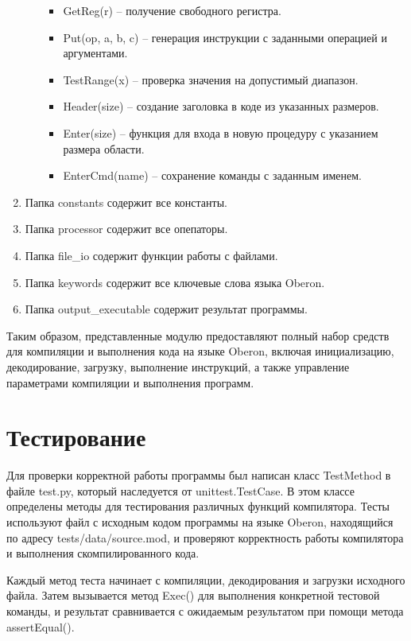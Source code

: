 \begin{enumerate}
\begin{itemize}[label = ---]
\begin{itemize}[label = +]
            \item GetReg(r) – получение свободного регистра.
            \item Put(op, a, b, c) – генерация инструкции с заданными операцией и аргументами.
            \item TestRange(x) – проверка значения на допустимый диапазон.
            \item Header(size) – создание заголовка в коде из указанных размеров.
            \item Enter(size) – функция для входа в новую процедуру с указанием размера области.
            \item EnterCmd(name) – сохранение команды с заданным именем.
        \end{itemize}
    \end{itemize} 
    \item Папка constants содержит все константы.
    \item Папка processor содержит все опепаторы.
    \item Папка file\_io содержит функции работы с файлами. 
    \item Папка keywords содержит все ключевые слова языка Oberon.
    \item Папка output\_executable содержит результат программы.
\end{enumerate}

Таким образом, представленные модулю предоставляют полный набор средств для компиляции и выполнения кода на языке Oberon, включая инициализацию, декодирование, загрузку, выполнение инструкций, а также управление параметрами компиляции и выполнения программ.

\section{Тестирование}

Для проверки корректной работы программы был написан класс TestMethod в файле test.py, который наследуется от unittest.TestCase. В этом классе определены методы для тестирования различных функций компилятора. Тесты используют файл с исходным кодом программы на языке Oberon, находящийся по адресу tests/data/source.mod, и проверяют корректность работы компилятора и выполнения скомпилированного кода.

Каждый метод теста начинает с компиляции, декодирования и загрузки исходного файла. Затем вызывается метод Exec() для выполнения конкретной тестовой команды, и результат сравнивается с ожидаемым результатом при помощи метода assertEqual().

